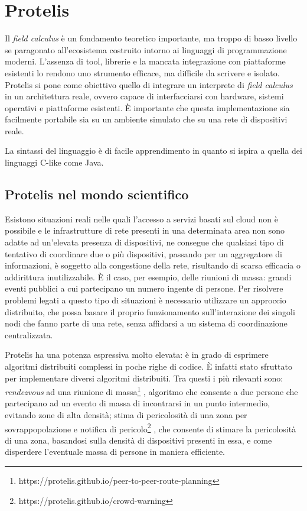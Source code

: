 \section{Protelis}
Il \textit{field calculus} è un fondamento teoretico importante, ma troppo di
basso livello se paragonato all'ecosistema costruito intorno ai linguaggi di
programmazione moderni. L'assenza di tool, librerie e la mancata integrazione
con piattaforme esistenti lo rendono uno strumento efficace, ma difficile da
scrivere e isolato. Protelis si pone come obiettivo quello di integrare un
interprete di \textit{field calculus} in un architettura reale, ovvero capace di
interfacciarsi con hardware, sistemi operativi e piattaforme esistenti. È importante che
questa implementazione sia facilmente portabile sia su un ambiente simulato che
su una rete di dispositivi reale.

La sintassi del linguaggio è di facile apprendimento in quanto si ispira a
quella dei linguaggi C-like come Java.

\subsection{Protelis nel mondo scientifico}
Esistono situazioni reali nelle quali l'accesso a servizi basati sul cloud non è
possibile e le infrastrutture di rete presenti in una determinata area non sono
adatte ad un'elevata presenza di dispositivi, ne consegue che qualsiasi tipo di
tentativo di coordinare due o più dispositivi, passando per un aggregatore di
informazioni, è soggetto alla congestione della rete, risultando di scarsa
efficacia o addirittura inutilizzabile. È il caso, per esempio, delle riunioni
di massa: grandi eventi pubblici a cui partecipano un numero ingente di persone.
Per risolvere problemi legati a questo tipo di situazioni è necessario
utilizzare un approccio distribuito, che possa basare il proprio funzionamento
sull'interazione dei singoli nodi che fanno parte di una rete, senza affidarsi a
un sistema di coordinazione centralizzata.

Protelis ha una potenza espressiva molto elevata: è in grado di esprimere
algoritmi distribuiti complessi in poche righe di codice. È infatti stato
sfruttato per implementare diversi algoritmi distribuiti. Tra questi i più
rilevanti sono: \textit{rendezvous} ad una riunione di
massa\footnote{https://protelis.github.io/peer-to-peer-route-planning}
\cite{Protelis}, algoritmo che consente a due persone che partecipano ad un
evento di massa di incontrarsi in un punto intermedio, evitando zone di alta
densità; stima di pericolosità di una zona per sovrappopolazione e notifica di
pericolo\footnote{https://protelis.github.io/crowd-warning} \cite{7056345}, che
consente di stimare la pericolosità di una zona, basandosi sulla densità di
dispositivi presenti in essa, e come disperdere l'eventuale massa di persone in
maniera efficiente.

